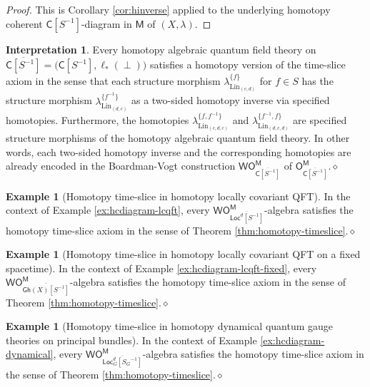\documentclass{amsbook}
\numberwithin{section}{chapter}
\numberwithin{subsection}{section}
\numberwithin{equation}{section}
\theoremstyle{plain}
\theoremstyle{definition}
\newtheorem{example}[equation]{Example}
\newtheorem{interpretation}[equation]{Interpretation}
\newcommand{\Lin}{\mathrm{Lin}}
\newcommand{\C}{\mathsf{C}}
\newcommand{\M}{\mathsf{M}}
\renewcommand{\O}{\mathsf{O}}
\newcommand{\Otom}{\O^{\M}}
\newcommand{\W}{\mathsf{W}}
\newcommand{\dqed}{\hfill$\diamond$}
\newcommand{\inv}[1]{{#1}^{-1}}
\newcommand{\finverse}{\inv{f}}
\newcommand{\Sinv}{\inv{S}}
\newcommand{\Csinv}{\C[\inv{S}]}
\newcommand{\Csinvbar}{\overline{\Csinv}}
\newcommand{\Ocsinvbar}{\O_{\Csinvbar}}
\newcommand{\Ocsinvbarm}{\Ocsinvbar^{\M}}
\newcommand{\Bgloc}{\Locd_G}
\newcommand{\Bglocsginv}{\Bgloc[\inv{S_G}]}
\newcommand{\Bglocsginvbar}{\overline{\Bglocsginv}}
\newcommand{\Gh}{\mathsf{Gh}}
\newcommand{\Ghx}{\Gh(X)}
\newcommand{\Ghxsinvbar}{\overline{\Ghx[\Sinv]}}
\newcommand{\Loc}{\mathsf{Loc}}
\newcommand{\Locd}{\Loc^d}
\newcommand{\Locdsinv}{\Locd[\Sinv]}
\newcommand{\Locdsinvbar}{\overline{\Locdsinv}}
\newcommand{\wom}{\W\Otom}
\newcommand{\wocsinvbarm}{\W\Ocsinvbarm}
\begin{document}
\begin{proof}
This is Corollary \ref{cor:hinverse} applied to the underlying homotopy coherent $\Csinv$-diagram in $\M$ of $(X,\lambda)$.
\end{proof}

\begin{interpretation}
Every homotopy algebraic quantum field theory on $\Csinvbar=\bigl(\Csinv, \ell_*(\perp)\bigr)$ satisfies a homotopy version of the time-slice axiom in the sense that each structure morphism $\lambda_{\Lin_{(c,d)}}^{\{f\}}$ for $f \in S$ has the structure morphism $\lambda_{\Lin_{(d,c)}}^{\{\finverse\}}$ as a two-sided homotopy inverse via specified homotopies.  Furthermore, the homotopies $\lambda^{\{f,\finverse\}}_{\Lin_{(c,d,c)}}$ and $\lambda^{\{\finverse,f\}}_{\Lin_{(d,c,d)}}$ are specified structure morphisms of the homotopy algebraic quantum field theory.  In other words, each two-sided homotopy inverse and the corresponding homotopies are already encoded in the Boardman-Vogt construction $\wocsinvbarm$ of $\Ocsinvbarm$.\dqed
\end{interpretation}

\begin{example}[Homotopy time-slice in homotopy locally covariant QFT]\label{ex:hts-hlcqft}
In the context of Example \ref{ex:hcdiagram-lcqft}, every $\wom_{\Locdsinvbar}$-algebra satisfies the homotopy time-slice axiom in the sense of Theorem \ref{thm:homotopy-timeslice}.\dqed
\end{example}

\begin{example}[Homotopy time-slice in homotopy locally covariant QFT on a fixed spacetime]\label{ex:hts-hlcqft-fixed}
In the context of Example \ref{ex:hcdiagram-lcqft-fixed}, every  $\wom_{\Ghxsinvbar}$-algebra satisfies the homotopy time-slice axiom in the sense of Theorem \ref{thm:homotopy-timeslice}.\dqed
\end{example}

\begin{example}[Homotopy time-slice in homotopy dynamical quantum gauge theories on principal bundles]\label{ex:hts-bundle}
In the context of Example \ref{ex:hcdiagram-dynamical}, every  $\wom_{\Bglocsginvbar}$-algebra satisfies the homotopy time-slice axiom in the sense of Theorem \ref{thm:homotopy-timeslice}.\dqed
\end{example}
\end{document}
